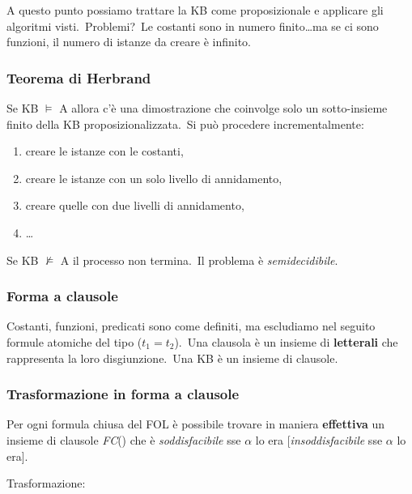 \noindent A questo punto possiamo trattare la KB come proposizionale e applicare gli algoritmi visti.\ Problemi?\ Le costanti sono in numero finito\dots ma se ci sono funzioni, il numero di istanze da creare è infinito.

\subsubsection{Teorema di Herbrand}

Se KB $\models$ A allora c'è una dimostrazione che coinvolge solo un sotto-insieme finito della KB proposizionalizzata.\
Si può procedere incrementalmente:
\begin{enumerate}
	\item creare le istanze con le costanti,
	\item creare le istanze con un solo livello di annidamento,
	\item creare quelle con due livelli di annidamento,
	\item \dots
\end{enumerate}

\noindent Se KB $\not\models$ A il processo non termina.\
Il problema è \textit{semidecidibile}.

\subsubsection{Forma a clausole}

Costanti, funzioni, predicati sono come definiti, ma escludiamo nel seguito formule atomiche del tipo ($t_1 = t_2$).\
Una clausola è un insieme di \textbf{letterali} che rappresenta la loro disgiunzione.\
Una KB è un insieme di clausole.

\subsubsection{Trasformazione in forma a clausole}

\begin{theorem}
	Per ogni formula chiusa del FOL è possibile trovare in maniera \textbf{effettiva} un insieme di clausole \textit{FC}() che è \textit{soddisfacibile} sse $\alpha$ lo era [\textit{insoddisfacibile} sse $\alpha$ lo era].\
\end{theorem}

\noindent Trasformazione:\

